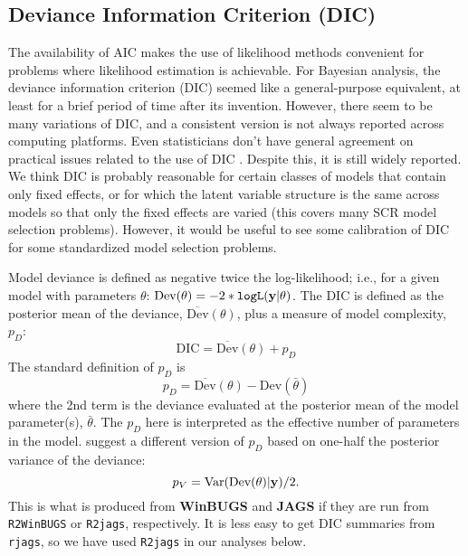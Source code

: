 \subsection{Deviance Information Criterion (DIC) }

The availability of AIC makes the use of likelihood methods convenient
for problems where likelihood estimation is achievable.  For Bayesian
analysis, the deviance information criterion (DIC) seemed like a
general-purpose equivalent, at least for a brief period of time after
its invention.  However, there seem to be many variations of DIC, and
a consistent version is not always reported across computing
platforms.
Even statisticians don't have general agreement on practical issues
related to the use of DIC \citep{millar:2009}.
Despite this, it is
still widely reported. We think DIC is probably reasonable for certain
classes of models that contain only fixed effects, or for which the
latent variable structure is the same across models so that only the
fixed effects are varied (this covers many SCR model selection
problems).  However, it would be useful to see some calibration of DIC
for some standardized model selection problems.

Model deviance is defined as negative twice the log-likelihood;
i.e., for a given model with parameters $\theta$: $\mbox{Dev}(\theta) =
-2*\mbox{\tt logL}({\bf y}|\theta)$.  The DIC is defined as the
posterior mean of the deviance, $\overline{\mbox{Dev}}(\theta)$, plus a measure of model complexity,
$p_{D}$:
\[
 \mbox{DIC} = \overline{\mbox{Dev}}(\theta) + p_{D}
\]
The standard definition of $p_{D}$ is
\[
 p_{D} = \overline{\mbox{Dev}}(\theta) - \mbox{Dev}(\bar{\theta})
\]
where the 2nd term is the deviance evaluated at the posterior mean of
the model parameter(s), $\bar{\theta}$. The $p_{D}$ here is interpreted as the effective
number of parameters in the model.  \citet{gelman_etal:2004} suggest a
different version of $p_{D}$ based on one-half the posterior variance
of the deviance:
\[
 p_{V} = \mbox{Var}(\mbox{Dev}(\theta)|{\bf y})/2.
\]
This is what is produced from {\bf WinBUGS} and {\bf JAGS} if they are
run from \mbox{\tt R2WinBUGS} or \mbox{\tt R2jags}, respectively.  It
is less easy to get DIC summaries from \mbox{\tt rjags}, so we have
used \mbox{\tt R2jags} in our analyses below.


